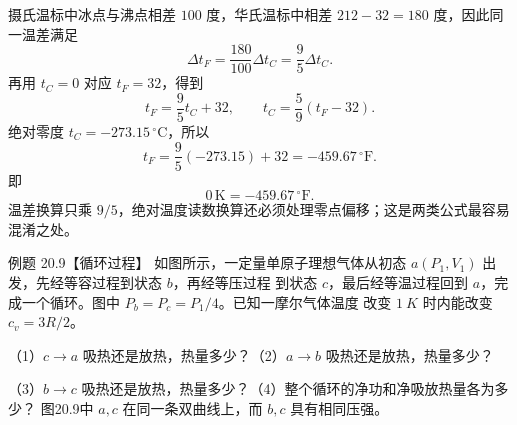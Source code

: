 \begin{xesolution}
摄氏温标中冰点与沸点相差 $100$ 度，华氏温标中相差 $212-32=180$ 度，因此同一温差满足
\begin{equation*}
  \Delta t_F=\frac{180}{100}\Delta t_C=\frac95\Delta t_C.
\end{equation*}
再用 $t_C=0$ 对应 $t_F=32$，得到
\begin{equation}
  \boxed{t_F=\frac95t_C+32},
  \qquad
  \boxed{t_C=\frac59(t_F-32)}.
\end{equation}
绝对零度 $t_C=-273.15\,{}^\circ\mathrm C$，所以
\begin{equation*}
  t_F=\frac95(-273.15)+32=-459.67\,{}^\circ\mathrm F.
\end{equation*}
即
\begin{equation}
  \boxed{0\,\mathrm K=-459.67\,{}^\circ\mathrm F}.
\end{equation}
温差换算只乘 $9/5$，绝对温度读数换算还必须处理零点偏移；这是两类公式最容易混淆之处。
\end{xesolution}

\begin{origexamplebox}{例题 20.9【循环过程】}
如图所示，一定量单原子理想气体从初态 $a(P_1,V_1)$ 出发，先经等容过程到状态 $b$，再经等压过程
到状态 $c$，最后经等温过程回到 $a$，完成一个循环。图中 $P_b=P_c=P_1/4$。已知一摩尔气体温度
改变 $\SI{1}{K}$ 时内能改变 $c_v=3R/2$。

（1）$c\to a$ 吸热还是放热，热量多少？（2）$a\to b$ 吸热还是放热，热量多少？

（3）$b\to c$ 吸热还是放热，热量多少？（4）整个循环的净功和净吸放热量各为多少？
\cycleQuestionRedraw
{}
图20.9中 $a,c$ 在同一条双曲线上，而 $b,c$ 具有相同压强。
\end{origexamplebox}

